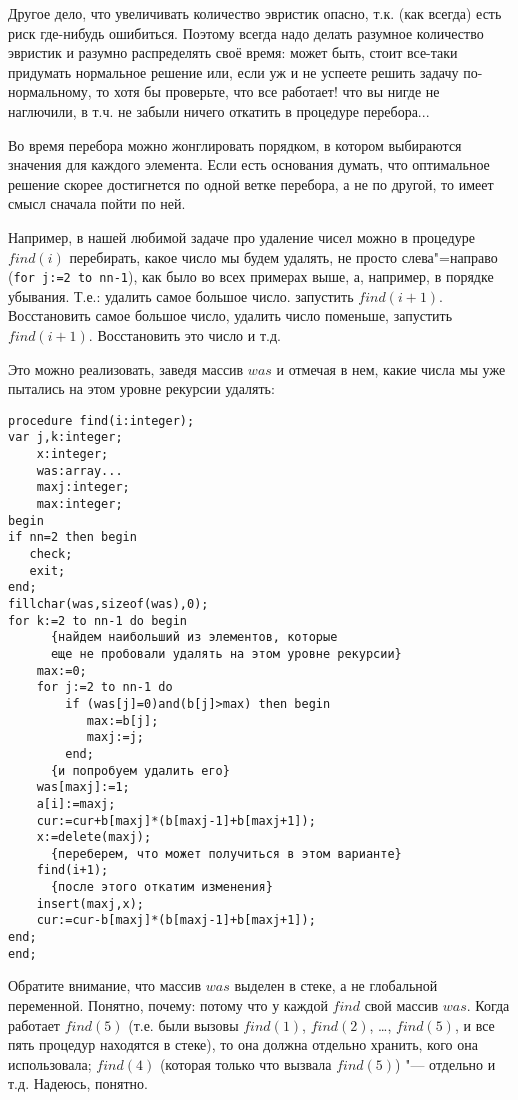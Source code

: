 Другое дело, что увеличивать количество эвристик опасно, т.к. (как всегда) есть риск где-нибудь ошибиться. Поэтому всегда надо делать разумное количество эвристик и разумно распределять своё время: может быть, стоит все-таки придумать нормальное решение или, если уж и не успеете решить задачу 
по-нормальному, то хотя бы проверьте, что все работает! что вы нигде не наглючили, в т.ч. не забыли ничего откатить в процедуре перебора...


Во время перебора можно жонглировать порядком, в котором выбираются значения для каждого 
элемента. Если есть основания думать, что оптимальное решение скорее достигнется по одной ветке перебора, а не по другой, то имеет смысл сначала пойти по ней.

Например, в нашей любимой задаче про удаление чисел можно в процедуре $find(i)$ перебирать, какое число мы 
будем удалять, не просто слева"=направо (\texttt{for j:=2 to nn-1}), как было во всех примерах выше, а, например, в порядке убывания. Т.е.: удалить самое большое число. запустить $find(i+1)$. 
Восстановить самое большое число, удалить число поменьше, запустить $find(i+1)$. Восстановить это число и т.д. 

Это можно реализовать, заведя массив $was$ и отмечая в нем, какие числа мы уже пытались на этом 
уровне рекурсии удалять:

\begin{codesample}\begin{verbatim}
procedure find(i:integer);
var j,k:integer;
    x:integer;
    was:array...
    maxj:integer;
    max:integer;
begin
if nn=2 then begin
   check;
   exit;
end;
fillchar(was,sizeof(was),0);
for k:=2 to nn-1 do begin
      {найдем наибольший из элементов, которые 
      еще не пробовали удалять на этом уровне рекурсии}
    max:=0;  
    for j:=2 to nn-1 do 
        if (was[j]=0)and(b[j]>max) then begin
           max:=b[j];
           maxj:=j;
        end;
      {и попробуем удалить его}
    was[maxj]:=1;
    a[i]:=maxj;
    cur:=cur+b[maxj]*(b[maxj-1]+b[maxj+1]);
    x:=delete(maxj);
      {переберем, что может получиться в этом варианте}
    find(i+1);
      {после этого откатим изменения}
    insert(maxj,x);
    cur:=cur-b[maxj]*(b[maxj-1]+b[maxj+1]);
end;
end;
\end{verbatim}
\end{codesample}

Обратите внимание, что массив $was$ выделен в стеке, а не глобальной переменной. Понятно, 
почему: потому что у каждой $find$ свой массив $was$. Когда работает $find(5)$ (т.е. были вызовы $find(1)$, $find(2)$, \dots, $find(5)$, и все пять процедур находятся в стеке), то она должна отдельно 
хранить, кого она использовала; $find(4)$ (которая только что вызвала $find(5)$) "--- отдельно и т.д. Надеюсь, понятно.

